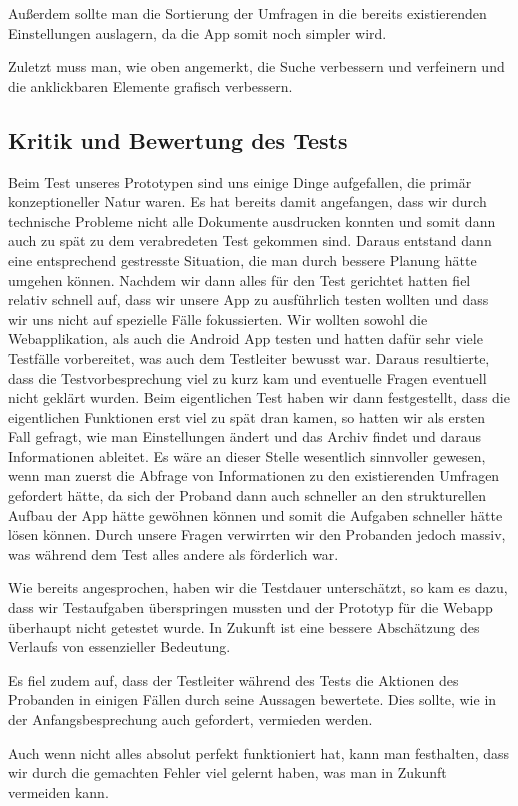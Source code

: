 Außerdem sollte man die Sortierung der Umfragen in die bereits existierenden Einstellungen auslagern, da die App somit noch simpler wird.

Zuletzt muss man, wie oben angemerkt, die Suche verbessern und verfeinern und die anklickbaren Elemente grafisch verbessern.

\subsection{Kritik und Bewertung des Tests}
\label{sec:kritik}

Beim Test unseres Prototypen sind uns einige Dinge aufgefallen, die primär konzeptioneller Natur waren. Es hat bereits damit angefangen, dass wir durch technische Probleme nicht alle Dokumente ausdrucken konnten und somit dann auch zu spät zu dem verabredeten Test gekommen sind. Daraus entstand dann eine entsprechend gestresste Situation, die man durch bessere Planung hätte umgehen können. 
Nachdem wir dann alles für den Test gerichtet hatten fiel relativ schnell auf, dass wir unsere App zu ausführlich testen wollten und dass wir uns nicht auf spezielle Fälle fokussierten. Wir wollten sowohl die Webapplikation, als auch die Android App testen und hatten dafür sehr viele Testfälle vorbereitet, was auch dem Testleiter bewusst war. Daraus resultierte, dass die Testvorbesprechung viel zu kurz kam und eventuelle Fragen eventuell nicht geklärt wurden.
Beim eigentlichen Test haben wir dann festgestellt, dass die eigentlichen Funktionen erst viel zu spät dran kamen, so hatten wir als ersten Fall gefragt, wie man Einstellungen ändert und das Archiv findet und daraus Informationen ableitet. Es wäre an dieser Stelle wesentlich sinnvoller gewesen, wenn man zuerst die Abfrage von Informationen zu den existierenden Umfragen gefordert hätte, da sich der Proband dann auch schneller an den strukturellen Aufbau der App hätte gewöhnen können und somit die Aufgaben schneller hätte lösen können. Durch unsere Fragen verwirrten wir den Probanden jedoch massiv, was während dem Test alles andere als förderlich war.

Wie bereits angesprochen, haben wir die Testdauer unterschätzt, so kam es dazu, dass wir Testaufgaben überspringen mussten und der Prototyp für die Webapp überhaupt nicht getestet wurde. In Zukunft ist eine bessere Abschätzung des Verlaufs von essenzieller Bedeutung.

Es fiel zudem auf, dass der Testleiter während des Tests die Aktionen des Probanden in einigen Fällen durch seine Aussagen bewertete. Dies sollte, wie in der Anfangsbesprechung auch gefordert, vermieden werden.

Auch wenn nicht alles absolut perfekt funktioniert hat, kann man festhalten, dass wir durch die gemachten Fehler viel gelernt haben, was man in Zukunft vermeiden kann.

\clearpage